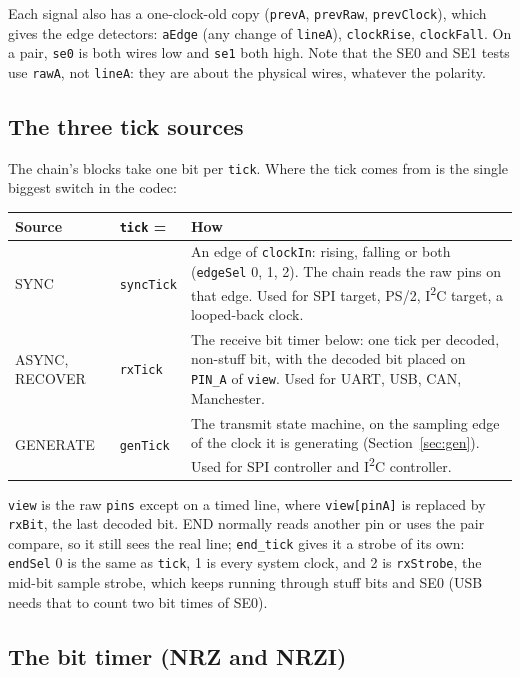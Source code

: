 \documentclass[11pt,a4paper]{article}
\newcommand{\sig}[1]{\texttt{#1}}
\begin{document}
Each signal also has a one-clock-old copy (\sig{prevA}, \sig{prevRaw}, \sig{prevClock}), which gives the edge detectors: \sig{aEdge} (any change of \sig{lineA}), \sig{clockRise}, \sig{clockFall}. On a pair, \sig{se0} is both wires low and \sig{se1} both high. Note that the SE0 and SE1 tests use \sig{rawA}, not \sig{lineA}: they are about the physical wires, whatever the polarity.

\subsection{The three tick sources}

The chain's blocks take one bit per \sig{tick}. Where the tick comes from is the single biggest switch in the codec:

\begin{center}
\begin{tabularx}{\linewidth}{@{}l l L@{}}
\toprule
Source & \sig{tick} = & How \\
\midrule
SYNC & \sig{syncTick} & An edge of \sig{clockIn}: rising, falling or both (\sig{edgeSel} 0, 1, 2). The chain reads the raw pins on that edge. Used for SPI target, PS/2, I\textsuperscript{2}C target, a looped-back clock. \\
ASYNC, RECOVER & \sig{rxTick} & The receive bit timer below: one tick per decoded, non-stuff bit, with the decoded bit placed on \sig{PIN\_A} of \sig{view}. Used for UART, USB, CAN, Manchester. \\
GENERATE & \sig{genTick} & The transmit state machine, on the sampling edge of the clock it is generating (Section~\ref{sec:gen}). Used for SPI controller and I\textsuperscript{2}C controller. \\
\bottomrule
\end{tabularx}
\end{center}

\sig{view} is the raw \sig{pins} except on a timed line, where \sig{view[pinA]} is replaced by \sig{rxBit}, the last decoded bit. END normally reads another pin or uses the pair compare, so it still sees the real line; \sig{end\_tick} gives it a strobe of its own: \sig{endSel} 0 is the same as \sig{tick}, 1 is every system clock, and 2 is \sig{rxStrobe}, the mid-bit sample strobe, which keeps running through stuff bits and SE0 (USB needs that to count two bit times of SE0).

\subsection{The bit timer (NRZ and NRZI)}
\end{document}
